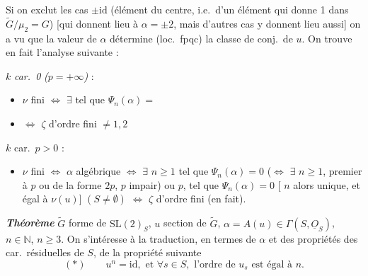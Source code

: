 \documentclass[11pt,a4paper]{article}
\begin{document}
Si on exclut les cas $\pm\mathrm{id}$ (élément du centre, i.e.\ d'un élément
qui donne 1 dans $\widetilde{G}/\mu_2 = G$) [qui donnent lieu à
$\alpha = \pm 2$, mais d'autres cas y donnent lieu aussi] on a vu que la
valeur de $\alpha$ détermine (loc.\ fpqc) la classe de conj.\ de $u$. On
trouve en fait l'analyse suivante :



$k$ \emph{car.\ 0} \emph{($p = +\infty$)} :
\begin{itemize}
  \item[\struck{a)}] $\nu$ fini $\Longleftrightarrow$ $\exists$ 
  tel que $\Psi_n(\alpha) =$
  \item[\struck{b)}] \struck{\ill{}} $\Longleftrightarrow$  $\zeta$ d'ordre fini $\neq 1, 2$
\end{itemize}

$k$ car.\ $p > 0$ :
\begin{itemize}
  \item[b)] $\nu$ fini $\Longleftrightarrow$ $\alpha$ algébrique
  $\Longleftrightarrow$ $\exists$ $n \geq 1$ tel que $\Psi_n(\alpha) = 0$
  ($\Longleftrightarrow$ $\exists$ $n \geq 1$, premier à $p$ ou de la forme
  $2p$,  $p$ impair) ou $p$, tel que $\Psi_n(\alpha) = 0$
  [ $n$  alors unique, et égal à $\nu(u)$] $(S \neq
  \emptyset)$ $\Longleftrightarrow$ $\zeta$ d'ordre fini (en fait).
\end{itemize}

\textbf{\emph{Théorème}} $\widetilde{G}$ forme de $\mathrm{SL}(2)_S$, $u$
section de $\widetilde{G}$, $\alpha = A(u) \in \Gamma(S, \underline{O}_S)$,
$n \in \mathbb{N}$, $\boxed{n \geq 3}$. On s'intéresse à la traduction, en
termes de $\alpha$ et des propriétés des car.\ résiduelles de $S$, de la
propriété suivante
\[
  (*) \qquad u^n = \mathrm{id}, \text{ et } \forall s \in S, \text{ l'ordre de } u_s \text{ est égal à } n.
\]
\end{document}
